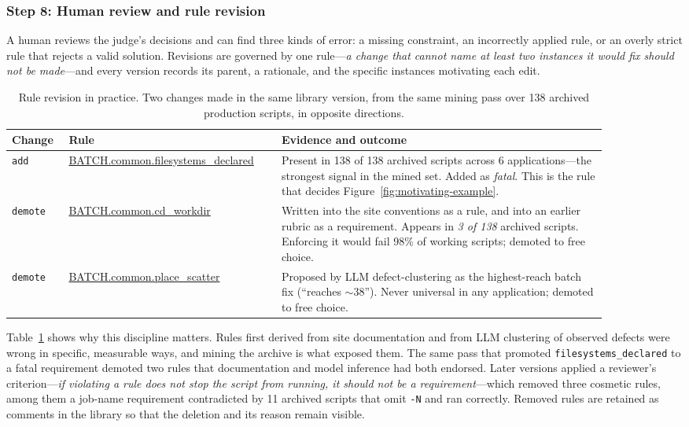 \documentclass[conference]{IEEEtran}
\begin{document}
\subsubsection{Step 8: Human review and rule revision}
A human reviews the judge's decisions and can find three kinds of error: a missing constraint, an incorrectly applied rule, or an overly strict rule that rejects a valid solution. Revisions are governed by one rule---\emph{a change that cannot name at least two instances it would fix should not be made}---and every version records its parent, a rationale, and the specific instances motivating each edit.

\begin{table}[t]
\centering
\scriptsize
\caption{Rule revision in practice. Two changes made in the same library version, from the same mining pass over 138 archived production scripts, in opposite directions.}
\label{tab:rule-evolution}
\begin{tabular}{@{}p{0.085\linewidth}p{0.30\linewidth}p{0.50\linewidth}@{}}
\toprule
Change & Rule & Evidence and outcome \\
\midrule
\texttt{add} & \url{BATCH.common.filesystems_declared} & Present in 138 of 138 archived scripts across 6 applications---the strongest signal in the mined set. Added as \emph{fatal}. This is the rule that decides Figure~\ref{fig:motivating-example}. \\
\addlinespace
\texttt{demote} & \url{BATCH.common.cd_workdir} & Written into the site conventions as a rule, and into an earlier rubric as a requirement. Appears in \emph{3 of 138} archived scripts. Enforcing it would fail 98\% of working scripts; demoted to free choice. \\
\addlinespace
\texttt{demote} & \url{BATCH.common.place_scatter} & Proposed by LLM defect-clustering as the highest-reach batch fix (``reaches $\sim$38''). Never universal in any application; demoted to free choice. \\
\bottomrule
\end{tabular}
\end{table}

Table~\ref{tab:rule-evolution} shows why this discipline matters. Rules first derived from site documentation and from LLM clustering of observed defects were wrong in specific, measurable ways, and mining the archive is what exposed them. The same pass that promoted \texttt{filesystems\_declared} to a fatal requirement demoted two rules that documentation and model inference had both endorsed. Later versions applied a reviewer's criterion---\emph{if violating a rule does not stop the script from running, it should not be a requirement}---which removed three cosmetic rules, among them a job-name requirement contradicted by 11 archived scripts that omit \texttt{-N} and ran correctly. Removed rules are retained as comments in the library so that the deletion and its reason remain visible.
\end{document}

